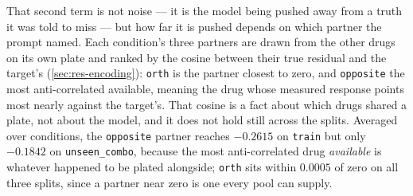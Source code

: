 That second term is not noise --- it is the model being pushed away from a truth
it was told to miss --- but how far it is pushed depends on which partner the
prompt named. Each condition's three partners are drawn from the other drugs on
its own plate and ranked by the cosine between their true residual and the
target's (\cref{sec:res-encoding}): \texttt{orth} is the partner closest to zero,
and \texttt{opposite} the most anti-correlated available, meaning the drug whose
measured response points most nearly against the target's. That cosine is a fact
about which drugs shared a plate, not about the model, and it does not hold still
across the splits. Averaged over conditions, the \texttt{opposite} partner reaches
$-0.2615$ on \texttt{train} but only $-0.1842$ on \texttt{unseen\_combo}, because
the most anti-correlated drug \emph{available} is whatever happened to be plated
alongside; \texttt{orth} sits within $0.0005$ of zero on all three splits, since a
partner near zero is one every pool can supply.

